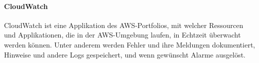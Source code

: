 \paragraph{CloudWatch} 
CloudWatch ist eine Applikation des AWS-Portfolios, mit welcher Ressourcen und Applikationen, die in der AWS-Umgebung laufen, in Echtzeit überwacht werden können. Unter anderem werden Fehler und ihre Meldungen dokumentiert, Hinweise und andere Logs gespeichert, und wenn gewünscht Alarme ausgelöst. 